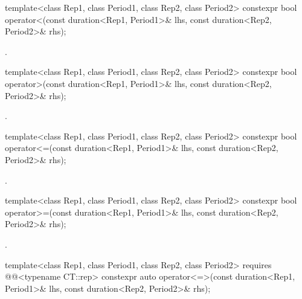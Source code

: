 %
\begin{itemdecl}
template<class Rep1, class Period1, class Rep2, class Period2>
  constexpr bool operator<(const duration<Rep1, Period1>& lhs,
                           const duration<Rep2, Period2>& rhs);
\end{itemdecl}

\begin{itemdescr}
\pnum
\returns
{}.
\end{itemdescr}

%
\begin{itemdecl}
template<class Rep1, class Period1, class Rep2, class Period2>
  constexpr bool operator>(const duration<Rep1, Period1>& lhs,
                           const duration<Rep2, Period2>& rhs);
\end{itemdecl}

\begin{itemdescr}
\pnum
\returns
{}.
\end{itemdescr}

%
\begin{itemdecl}
template<class Rep1, class Period1, class Rep2, class Period2>
  constexpr bool operator<=(const duration<Rep1, Period1>& lhs,
                            const duration<Rep2, Period2>& rhs);
\end{itemdecl}

\begin{itemdescr}
\pnum
\returns
{}.
\end{itemdescr}

%
\begin{itemdecl}
template<class Rep1, class Period1, class Rep2, class Period2>
  constexpr bool operator>=(const duration<Rep1, Period1>& lhs,
                            const duration<Rep2, Period2>& rhs);
\end{itemdecl}

\begin{itemdescr}
\pnum
\returns
{}.
\end{itemdescr}

%
\begin{itemdecl}
template<class Rep1, class Period1, class Rep2, class Period2>
  requires @@<typename CT::rep>
  constexpr auto operator<=>(const duration<Rep1, Period1>& lhs,
                             const duration<Rep2, Period2>& rhs);
\end{itemdecl}

